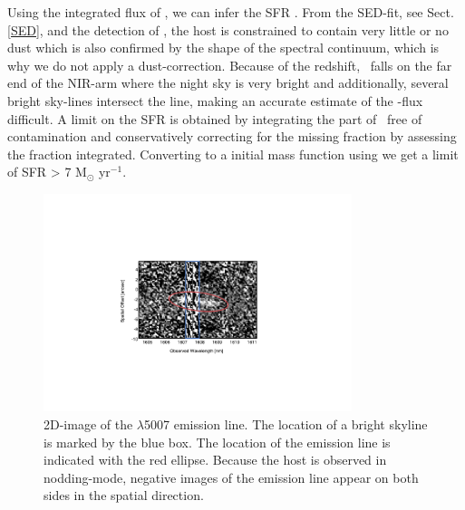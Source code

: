 \documentclass{aa}    %
\begin{document}

Using the integrated flux of \ha, we can infer the SFR \citep{Kennicutt1998}.
From the SED-fit, see Sect. \ref{SED}, and the detection of \lya, the host is
constrained to contain very little or no dust which is also confirmed by the
shape of the spectral continuum, which is why we do not apply a dust-correction.
Because of the redshift, \ha~falls on the far end of the NIR-arm where the night
sky is very bright and additionally, several bright sky-lines intersect the
line, making an accurate estimate of the \ha-flux difficult. A limit on the SFR
is obtained by integrating the part of \ha~free of contamination and
conservatively correcting for the missing fraction by assessing the fraction
integrated. Converting to a \citet{Chabrier2003} initial mass function using
\citet{Madau2014} we get a limit of SFR > 7 M$_\odot$ yr$^{-1}$.


\begin{figure}
	\centering
	\includegraphics[width=9cm]{figures/OIII_img.pdf}
	\caption{2D-image of the \oiii$\lambda$5007 emission line. The location of a bright skyline is marked by the blue box. The location of the emission line is indicated with the red ellipse. Because the host is observed in nodding-mode, negative images of the emission line appear on both sides in the spatial direction.}
	\label{fig:line}
\end{figure}
\end{document}

